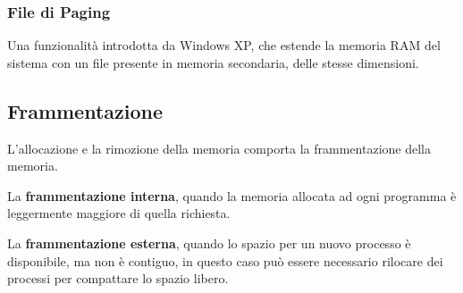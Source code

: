 \subsubsection*{File di Paging}
Una funzionalità introdotta da Windows XP, che estende la memoria RAM del sistema con un file presente in memoria secondaria, delle stesse dimensioni.

\subsection{Frammentazione}
L'allocazione e la rimozione della memoria comporta la frammentazione della memoria.
\begin{sitemize}
    \item La \textbf{frammentazione interna}, quando la memoria allocata ad ogni programma è leggermente maggiore di quella richiesta.
    \item La \textbf{frammentazione esterna}, quando lo spazio per un nuovo processo è disponibile, ma non è contiguo, in questo caso può essere necessario rilocare dei processi per compattare lo spazio libero.
\end{sitemize}
